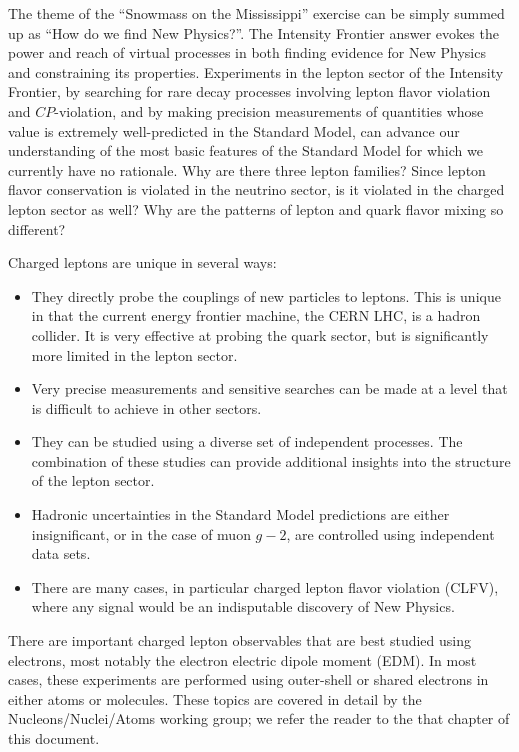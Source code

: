 The theme of the ``Snowmass on the Mississippi'' exercise can be simply summed up as ``How do we find New Physics?''. The Intensity Frontier answer evokes the power and reach of virtual processes in both finding evidence for New Physics and constraining its properties. Experiments in the lepton sector of the Intensity Frontier, by searching for rare decay processes involving lepton flavor violation and $C\!P$-violation, and by making precision measurements of quantities whose value is extremely well-predicted in the Standard Model, can advance our understanding of the most basic features of the Standard Model for which we currently have no rationale. Why are there three lepton families? Since lepton flavor conservation is violated in the neutrino sector, is it violated in the charged lepton sector as well? Why are the patterns of lepton and quark flavor mixing so different?

 Charged leptons are unique in several ways:
\begin{itemize}
\item
They directly probe the couplings of new particles to leptons.  This is unique in that the current energy frontier machine, the 
CERN LHC, is a hadron
collider. It is very effective at probing the quark sector, but
is significantly more limited in the lepton sector.
\item
Very
precise measurements  and sensitive searches can be made at a level that is difficult to achieve in
other sectors.
\item
They can be studied using a diverse set of independent
processes. The combination of these studies can provide additional
insights into the structure of the lepton sector.
\item
Hadronic uncertainties in the Standard Model predictions are either insignificant, or in the case of muon $g\!-\!2$, are controlled using independent data sets.
\item
There are  many cases, in particular charged lepton flavor violation (CLFV), where any signal would be an indisputable discovery of New Physics.
\end{itemize}

There are important charged lepton observables that are best studied using electrons, most notably the electron electric dipole moment (EDM).  In most cases, these experiments are performed using outer-shell or shared electrons in either atoms or molecules.  These topics are covered in detail by the Nucleons/Nuclei/Atoms working group; we refer the reader to the that chapter of this document.


